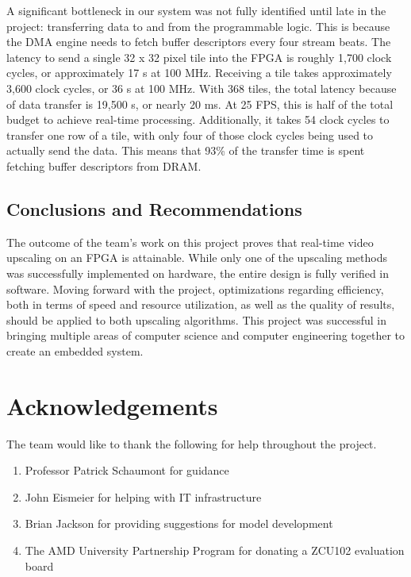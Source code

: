 \documentclass{article}
\begin{document}
\par A significant bottleneck in our system was not fully identified until late in the project: transferring data to and from the programmable logic. This is because the DMA engine needs to fetch buffer descriptors every four stream beats. The latency to send a single 32 x 32 pixel tile into the FPGA is roughly 1,700 clock cycles, or approximately 17 \textmu s at 100 MHz. Receiving a tile takes approximately 3,600 clock cycles, or 36 \textmu s at 100 MHz. With 368 tiles, the total latency because of data transfer is 19,500 \textmu s, or nearly 20 ms. At 25 FPS, this is half of the total budget to achieve real-time processing. Additionally, it takes 54 clock cycles to transfer one row of a tile, with only four of those clock cycles being used to actually send the data. This means that 93\% of the transfer time is spent fetching buffer descriptors from DRAM.

\subsection*{Conclusions and Recommendations}
\noindent The outcome of the team’s work on this project proves that real-time video upscaling on an FPGA is attainable. While only one of the upscaling methods was successfully implemented on hardware, the entire design is fully verified in software. Moving forward with the project, optimizations regarding efficiency, both in terms of speed and resource utilization, as well as the quality of results, should be applied to both upscaling algorithms. This project was successful in bringing multiple areas of computer science and computer engineering together to create an embedded system.

\section*{Acknowledgements}

\noindent The team would like to thank the following for help throughout the project.
\begin{enumerate} %
    \item Professor Patrick Schaumont for guidance
    \item John Eismeier for helping with IT infrastructure
    \item Brian Jackson for providing suggestions for model development
    \item The AMD University Partnership Program for donating a ZCU102 evaluation board

\end{enumerate}
\end{document}
